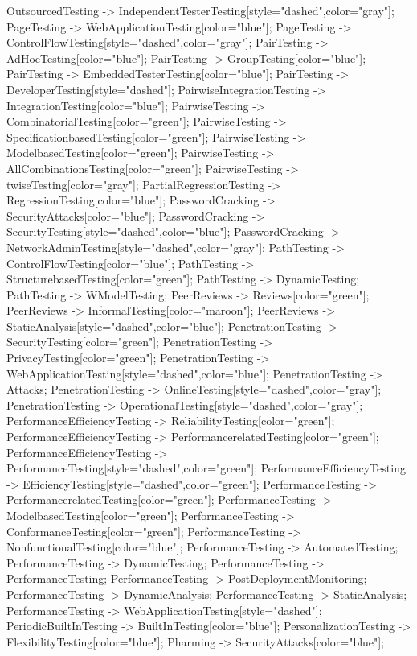 \documentclass{article}
\begin{document}
{OutsourcedTesting -> IndependentTesterTesting[style="dashed",color="gray"];
PageTesting -> WebApplicationTesting[color="blue"];
PageTesting -> ControlFlowTesting[style="dashed",color="gray"];
PairTesting -> AdHocTesting[color="blue"];
PairTesting -> GroupTesting[color="blue"];
PairTesting -> EmbeddedTesterTesting[color="blue"];
PairTesting -> DeveloperTesting[style="dashed"];
PairwiseIntegrationTesting -> IntegrationTesting[color="blue"];
PairwiseTesting -> CombinatorialTesting[color="green"];
PairwiseTesting -> SpecificationbasedTesting[color="green"];
PairwiseTesting -> ModelbasedTesting[color="green"];
PairwiseTesting -> AllCombinationsTesting[color="green"];
PairwiseTesting -> twiseTesting[color="gray"];
PartialRegressionTesting -> RegressionTesting[color="blue"];
PasswordCracking -> SecurityAttacks[color="blue"];
PasswordCracking -> SecurityTesting[style="dashed",color="blue"];
PasswordCracking -> NetworkAdminTesting[style="dashed",color="gray"];
PathTesting -> ControlFlowTesting[color="blue"];
PathTesting -> StructurebasedTesting[color="green"];
PathTesting -> DynamicTesting;
PathTesting -> WModelTesting;
PeerReviews -> Reviews[color="green"];
PeerReviews -> InformalTesting[color="maroon"];
PeerReviews -> StaticAnalysis[style="dashed",color="blue"];
PenetrationTesting -> SecurityTesting[color="green"];
PenetrationTesting -> PrivacyTesting[color="green"];
PenetrationTesting -> WebApplicationTesting[style="dashed",color="blue"];
PenetrationTesting -> Attacks;
PenetrationTesting -> OnlineTesting[style="dashed",color="gray"];
PenetrationTesting -> OperationalTesting[style="dashed",color="gray"];
PerformanceEfficiencyTesting -> ReliabilityTesting[color="green"];
PerformanceEfficiencyTesting -> PerformancerelatedTesting[color="green"];
PerformanceEfficiencyTesting -> PerformanceTesting[style="dashed",color="green"];
PerformanceEfficiencyTesting -> EfficiencyTesting[style="dashed",color="green"];
PerformanceTesting -> PerformancerelatedTesting[color="green"];
PerformanceTesting -> ModelbasedTesting[color="green"];
PerformanceTesting -> ConformanceTesting[color="green"];
PerformanceTesting -> NonfunctionalTesting[color="blue"];
PerformanceTesting -> AutomatedTesting;
PerformanceTesting -> DynamicTesting;
PerformanceTesting -> PerformanceTesting;
PerformanceTesting -> PostDeploymentMonitoring;
PerformanceTesting -> DynamicAnalysis;
PerformanceTesting -> StaticAnalysis;
PerformanceTesting -> WebApplicationTesting[style="dashed"];
PeriodicBuiltInTesting -> BuiltInTesting[color="blue"];
PersonalizationTesting -> FlexibilityTesting[color="blue"];
Pharming -> SecurityAttacks[color="blue"];
}
\end{document}
